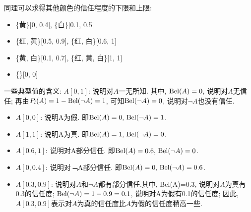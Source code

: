 同理可以求得其他颜色的信任程度的下限和上限:
\begin{itemize}
    \item \{黄\}[0, 0.4],         \quad         \{白\}[0.1,  0.5]
    \item \{红, 黄\}[0.5,  0.9],  \quad         \{红, 白\}[0.6,  1]
    \item \{黄, 白\}[0.1,  0.7],  \quad         \{红, 黄, 白\}[1, 1]
    \item \{\}[0,  0]
\end{itemize}

一些典型值的含义: $A[0,1]$: 说明对$A$一无所知.
其中, $\textup{Bel}(A)=0$, 说明对$A$无信任;
再由$P_l(A)=1-\textup{Bel}(\neg A)=1$, 可知$\textup{Bel}(\neg A)=0$, 说明对$\neg A$也没有信任.
\begin{itemize}
\item $A[0, 0]$: 说明A为假. 即$\textup{Bel}(A)=0,\, \textup{Bel}(\neg A)=1$.
\item $A[1, 1]$: 说明A为真. 即$\textup{Bel}(A)=1,\, \textup{Bel}(\neg A)=0$.
\item $A[0.6,1]$: 说明对A部分信任. 即$\textup{Bel}(A)=0.6,\, \textup{Bel}(\neg A)=0$.
\item $A[0, 0.4]$: 说明对﹁A部分信任. 即$\textup{Bel}(A)=0,\, \textup{Bel}(\neg A)=0.6$.
\item $A[0.3, 0.9]$: 说明对$A$和$\neg A$都有部分信任.其中, \textup{Bel}(A)=0.3, 说明对$A$为真有0.3的信任度;
        $\textup{Bel}(\neg  A)=1-0.9=0.1$, 说明对A为假有0.1的信任度;
因此, $A[0.3, 0.9]$表示对$A$为真的信任度比$A$为假的信任度稍高一些.
\end{itemize}

